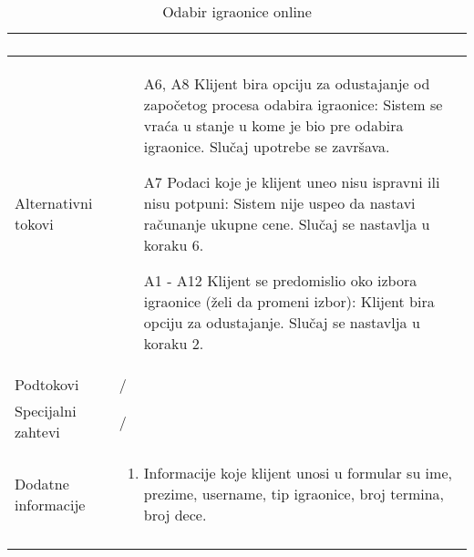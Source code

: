 \documentclass[../../main.tex]{subfiles}
\begin{document}
\begin{longtable}{| p{} | p{} |}
\begin{enumerate}
    \end{enumerate}\\
\hline
    Alternativni tokovi & 
    \begin{itemize}
        \item[A6, A8] Klijent bira opciju za odustajanje od započetog procesa odabira igraonice: Sistem se vraća u stanje u kome je bio pre odabira igraonice. Slučaj upotrebe se završava.
        \item[A7] Podaci koje je klijent uneo nisu ispravni ili nisu potpuni: Sistem nije uspeo da nastavi računanje ukupne cene. Slučaj se nastavlja u koraku 6.
        \item [A1 - A12] Klijent se predomislio oko izbora igraonice (želi da promeni izbor): Klijent bira opciju za odustajanje. Slučaj se nastavlja u koraku 2.
    \end{itemize} \\
\hline
    Podtokovi & /\\
\hline
    Specijalni zahtevi & /\\
\hline
    Dodatne informacije &
    \begin{enumerate}
        \item Informacije koje klijent unosi u formular su ime, prezime, username, tip igraonice, broj termina, broj dece.
    \end{enumerate}\\
\hline
\caption{Odabir igraonice online}
\end{longtable}
\end{document}
